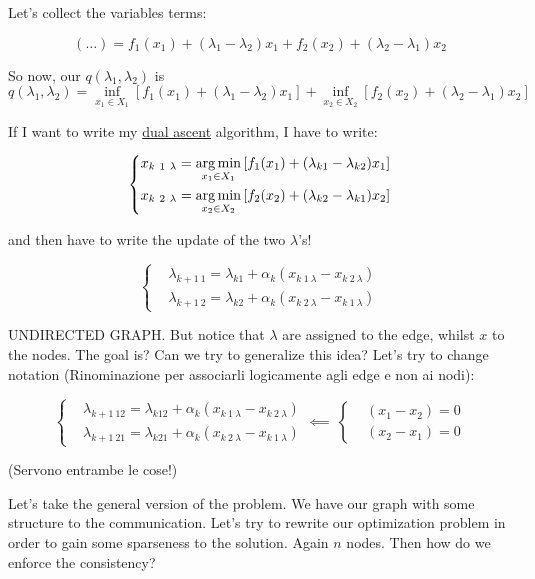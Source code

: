 Let's collect the variables terms:

\[
	(\dots) = f_1(x_1) + (\lambda_1-\lambda_2)x_1 + f_2(x_2) + (\lambda_2-\lambda_1)x_2
\]

So now, our $q(\lambda_1,\lambda_2)$ is
\[ 
	q(\lambda_1,\lambda_2) = \inf_{x_1\in X_1}{[f_1(x_1) + (\lambda_1-\lambda_2)x_1]} + \inf_{x_2\in X_2}{[f_2(x_2) + (\lambda_2-\lambda_1)x_2]}
\]

If I want to write my \underline{dual ascent} algorithm, I have to write:

\[
	\left\{
	\begin{aligned}
	&x_{k\ 1\ \lambda} = \operatorname*{arg\,min}_{x_1\in X_1}{[f_1(x_1) + (\lambda_{k1}-\lambda_{k2})x_1]}\\
	&x_{k\ 2\ \lambda} = \operatorname*{arg\,min}_{x_2\in X_2}{[f_2(x_2) + (\lambda_{k2}-\lambda_{k1})x_2]}
	\end{aligned}
	\right.
\]

and then have to write the update of the two $\lambda$'s!

\[
	\left\{
	\begin{aligned}
	&\lambda_{k+1\ 1} = \lambda_{k1} +\alpha_k(x_{k\ 1\ \lambda} - x_{k\ 2\ \lambda})\\
	&\lambda_{k+1\ 2} = \lambda_{k2} +\alpha_k(x_{k\ 2\ \lambda} - x_{k\ 1\ \lambda})
	\end{aligned}
	\right.
\]

UNDIRECTED GRAPH. But notice that $\lambda$ are assigned to the edge, whilst $x$ to the nodes. The goal is? Can we try to generalize this idea? Let's try to change notation (Rinominazione per associarli logicamente agli edge e non ai nodi):

\[
	\left\{
	\begin{aligned}
	&\lambda_{k+1\ 12} = \lambda_{k12} + \alpha_k(x_{k\ 1\ \lambda} - x_{k\ 2\ \lambda})\\
	&\lambda_{k+1\ 21} = \lambda_{k21} + \alpha_k(x_{k\ 2\ \lambda} - x_{k\ 1\ \lambda})
	\end{aligned}
	\right. \impliedby\ 
	\left\{
	\begin{aligned}
	&(x_1-x_2) = 0\\
	&(x_2-x_1) = 0
	\end{aligned}
	\right.
\]

(Servono entrambe le cose!)

Let's take the general version of the problem. We have our graph with some structure to the communication. Let's try to rewrite our optimization problem in order to gain some sparseness to the solution. Again $n$ nodes. Then how do we enforce the consistency?

